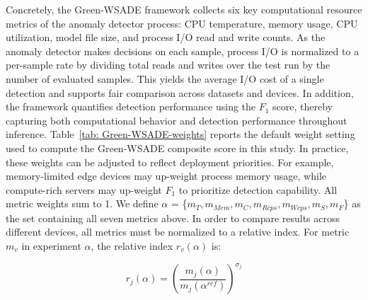 \documentclass[pdflatex,sn-mathphys-num]{sn-jnl}%
\theoremstyle{thmstyleone}
\theoremstyle{thmstyletwo}%
\theoremstyle{thmstylethree}%
\begin{document}
Concretely, the Green-WSADE framework collects six key computational resource metrics of the anomaly detector process: CPU temperature, memory usage, CPU utilization, model file size, and process I/O read and write counts. As the anomaly detector makes decisions on each sample, process I/O is normalized to a per-sample rate by dividing total reads and writes over the test run by the number of evaluated samples. This yields the average I/O cost of a single detection and supports fair comparison across datasets and devices.
In addition, the framework quantifies detection performance using the $F_1$ score, thereby capturing both computational behavior and detection performance throughout inference.
Table~\ref{tab: Green-WSADE-weights} reports the default weight setting used to compute the Green-WSADE composite score in this study. In practice, these weights can be adjusted to reflect deployment priorities. For example, memory-limited edge devices may up-weight process memory usage, while compute-rich servers may up-weight $F_1$ to prioritize detection capability.
All metric weights sum to 1. We define $\alpha$ = \{$m_{T},m_{Mem},m_{C},m_{Rcps},m_{Wcps},m_{S},m_{F}$\} as the set containing all seven metrics above. In order to compare results across different devices, all metrics must be normalized to a relative index. For metric $m_v$ in experiment $\alpha$, the relative index $r_v(\alpha)$ is:

\begin{equation}\label{equ: relative index}
r_j(\alpha) = \left(\frac{m_j(\alpha)}{m_j(\alpha^{ref})}\right)^{\sigma_j}
\end{equation}
\end{document}
